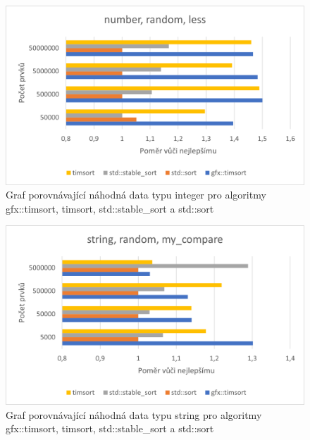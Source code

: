 \documentclass[thesis=B,czech]{FITthesis}[2019/12/23]
\begin{document}
\begin{figure}[htbp]\centering
	\includegraphics{obrazky/graf2.png}
	\caption[Graf porovnávající náhodná data typu integer pro algoritmy\linebreak gfx::timsort, timsort, std::stable\_sort a std::sort]{Graf porovnávající náhodná data typu integer pro algoritmy gfx::timsort, timsort, std::stable\_sort a std::sort}\label{fig:graf2}
\end{figure}

\begin{figure}[htbp]\centering
	\includegraphics{obrazky/graf3.png}
	\caption[Graf porovnávající náhodná data typu string pro algoritmy\linebreak gfx::timsort, timsort, std::stable\_sort a std::sort]{Graf porovnávající náhodná data typu string pro algoritmy gfx::timsort, timsort, std::stable\_sort a std::sort}\label{fig:graf3}
\end{figure}
\end{document}

